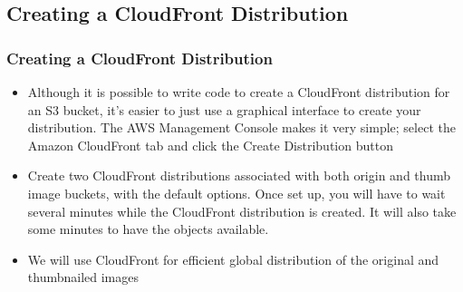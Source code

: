 \documentclass{beamer}
\begin{document}
\subsection{Creating a CloudFront Distribution}
\begin{frame}[fragile]
\frametitle{Creating a CloudFront Distribution}

\begin{itemize}
\item Although it is possible to write code to create a CloudFront distribution for an S3
bucket, it’s easier to just use a graphical interface to create your distribution.
The AWS Management Console makes it very simple; select the Amazon
CloudFront tab and click the Create Distribution button

\item Create two CloudFront distributions associated with both origin and thumb image buckets, with the default options.
 Once set up, you will have to wait several minutes while the CloudFront distribution is created. It will also take some
 minutes to have the objects available.
\item We will use CloudFront for efficient global distribution of the original and thumbnailed images

\end{itemize}

\end{frame}
\end{document}
